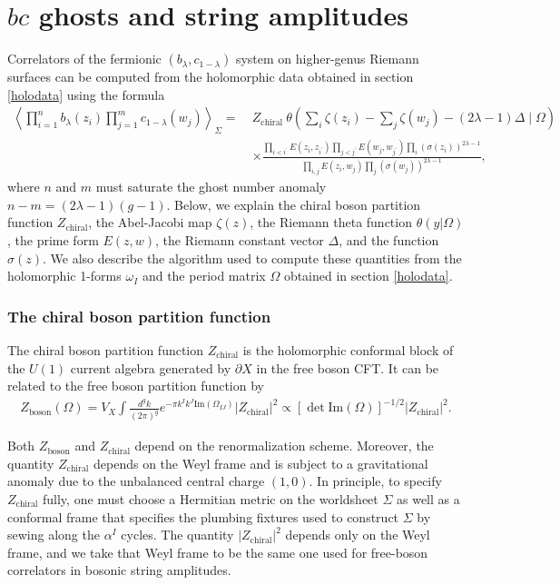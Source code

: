 \documentclass[12pt]{article}
\def\ie{\begin{equation}\begin{aligned}}
\def\fe{\end{aligned}\end{equation}}
\numberwithin{equation}{section}
\begin{document}
\section{$bc$ ghosts and string amplitudes}

Correlators of the fermionic $(b_\lambda, c_{1-\lambda})$ system on higher-genus Riemann surfaces can be computed from the holomorphic data obtained in section \ref{holodata} using the formula \cite{Verlinde:1986kw}
\ie \label{vvformula}
\left\langle\prod_{i=1}^n b_\lambda\left(z_i\right) \prod_{j=1}^m c_{1-\lambda}\left(w_j\right)\right\rangle_{\Sigma}=\  & Z_\text{chiral}\ \theta\left(\sum_i \zeta\left(z_i\right)-\sum_j \zeta\left(w_j\right)-(2 \lambda-1) \Delta \mid \Omega\right) \\
& \times \frac{\prod_{i<i^{\prime}} E\left(z_i, z_{i^{\prime}}\right) \prod_{j<j^{\prime}} E\left(w_j, w_{j^{\prime}}\right) \prod_i\left(\sigma\left(z_i\right)\right)^{2 \lambda-1}}{\prod_{i, j} E\left(z_i, w_j\right) \prod_j\left(\sigma\left(w_j\right)\right)^{2 \lambda-1}},
\fe 
where $n$ and $m$ must saturate the ghost number anomaly $n-m=(2\lambda-1)(g-1)$. Below, we explain the chiral boson partition function $Z_{\text{chiral}}$, the Abel-Jacobi map $\zeta(z)$, the Riemann theta function $\theta(y|\Omega)$, the prime form $E(z,w)$, the Riemann constant vector $\Delta$, and the function $\sigma(z)$. We also describe the algorithm used to compute these quantities from the holomorphic 1-forms $\omega_I$ and the period matrix $\Omega$ obtained in section \ref{holodata}.

\subsubsection*{The chiral boson partition function}

The chiral boson partition function $Z_{\text{chiral}}$ is the holomorphic conformal block of the $U(1)$ current algebra generated by $\partial X$ in the free boson CFT. It can be related to the free boson partition function by
\ie
Z_\text{boson}(\Omega) = V_X\int \frac{d^gk}{(2\pi)^g} e^{-\pi k^I k^J\mathrm{Im}(\Omega_{IJ})}|Z_\text{chiral}|^2 \propto \left[\det \mathrm{Im}(\Omega)\right]^{-1/2}|Z_\text{chiral}|^2.
\fe

Both $Z_\text{boson}$ and $Z_\text{chiral}$ depend on the renormalization scheme. Moreover, the quantity $Z_{\text{chiral}}$ depends on the Weyl frame and is subject to a gravitational anomaly due to the unbalanced central charge $(1,0)$. In principle, to specify $Z_{\text{chiral}}$ fully, one must choose a Hermitian metric on the worldsheet $\Sigma$ as well as a conformal frame that specifies the plumbing fixtures used to construct $\Sigma$ by sewing along the $\alpha^I$ cycles. The quantity $|Z_\text{chiral}|^2$ depends only on the Weyl frame, and we take that Weyl frame to be the same one used for free-boson correlators in bosonic string amplitudes. 
\end{document}
